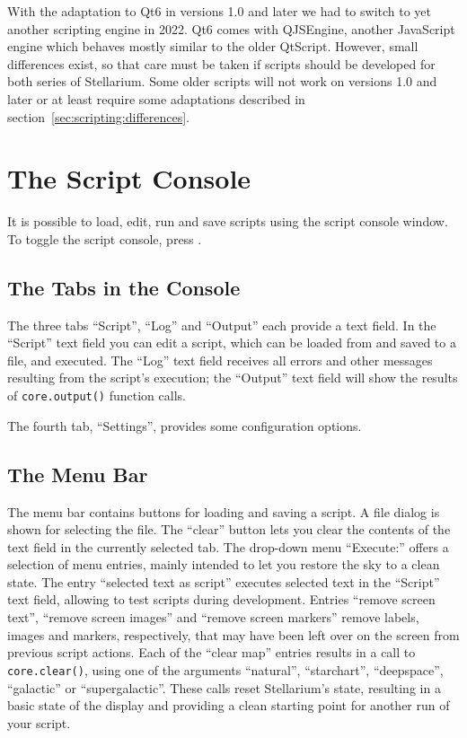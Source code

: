 With the adaptation to Qt6 in versions 1.0 and later we had to switch to 
yet another scripting engine in 2022. Qt6 comes with QJSEngine, another 
JavaScript engine which behaves mostly similar to the older QtScript. 
However, small differences exist, so that care must be taken if scripts 
should be developed for both series of Stellarium. Some older scripts 
will not work on versions 1.0 and later or at least require some adaptations 
described in section~\ref{sec:scripting:differences}. 

\section{The Script Console}
\label{sec:scripting:console}
It is possible to load, edit, run and save scripts using the script
console window. To toggle the script console, press .  

\subsection{The Tabs in the Console}

The three tabs ``Script'', ``Log'' and ``Output'' each provide a text
field. In the ``Script'' text field you can edit a script,
which can be loaded from and saved to a file, and executed. The ``Log''
text field receives all errors and other messages resulting from the
script's execution; the ``Output'' text field will show the results of
\texttt{core.output()} function calls. 

The fourth tab, ``Settings'', provides some configuration options.

\subsection{The Menu Bar}

The menu bar contains buttons for loading and saving a script. A file
dialog is shown for selecting the file. The ``clear'' button lets you
clear the contents of the text field in the currently selected tab.
The drop-down menu ``Execute:'' offers a selection of menu entries, mainly
intended to let you restore the sky to a clean state. The entry
``selected text as script'' executes selected text in the ``Script'' text
field, allowing to test scripts during development. 
Entries ``remove screen text'', ``remove screen images'' and 
``remove screen markers'' remove labels, images and markers, respectively,
that may have been left over on the screen from previous script actions. 
Each of the ``clear map'' entries
results in a call to \texttt{core.clear()}, using one of the arguments
``natural'', ``starchart'', ``deepspace'', ``galactic'' or ``supergalactic''.
These calls reset Stellarium's state, resulting in a basic state
of the display and providing a clean starting point for another run of
your script.

